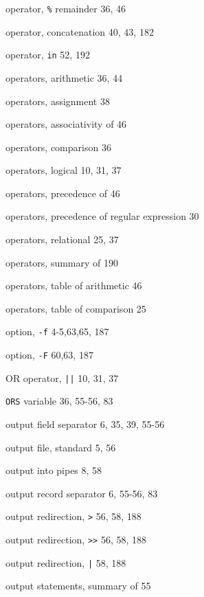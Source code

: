 \begin{multicols}{3}
\hangindent=3pc  operator, \verb'%' remainder 36, 46

\hangindent=3pc  operator, concatenation 40, 43,  182

\hangindent=3pc  operator, \verb'in' 52, 192

\hangindent=3pc  operators, arithmetic 36, 44

\hangindent=3pc  operators, assignment 38

\hangindent=3pc  operators, associativity of 46

\hangindent=3pc  operators, comparison 36

\hangindent=3pc  operators, logical 10, 31, 37

\hangindent=3pc  operators, precedence of 46

\hangindent=3pc  operators, precedence of regular expression 30

\hangindent=3pc  operators, relational 25, 37

\hangindent=3pc  operators, summary of 190

\hangindent=3pc  operators, table of arithmetic 46

\hangindent=3pc  operators, table of comparison 25

\hangindent=3pc  option, \verb'-f' 4-5,63,65, 187

\hangindent=3pc  option, \verb'-F' 60,63, 187

\hangindent=3pc  OR operator, \verb'||' 10, 31, 37

\hangindent=3pc  \verb'ORS' variable 36, 55-56, 83

\hangindent=3pc  output field separator 6, 35, 39, 55-56

\hangindent=3pc  output file, standard 5, 56

\hangindent=3pc  output into pipes 8, 58

\hangindent=3pc  output record separator 6, 55-56,  83

\hangindent=3pc  output redirection, \verb'>' 56, 58, 188

\hangindent=3pc  output redirection, \verb'>>' 56, 58, 188

\hangindent=3pc  output redirection, \verb'|' 58, 188

\hangindent=3pc  output statements, summary of 55


\end{multicols}
